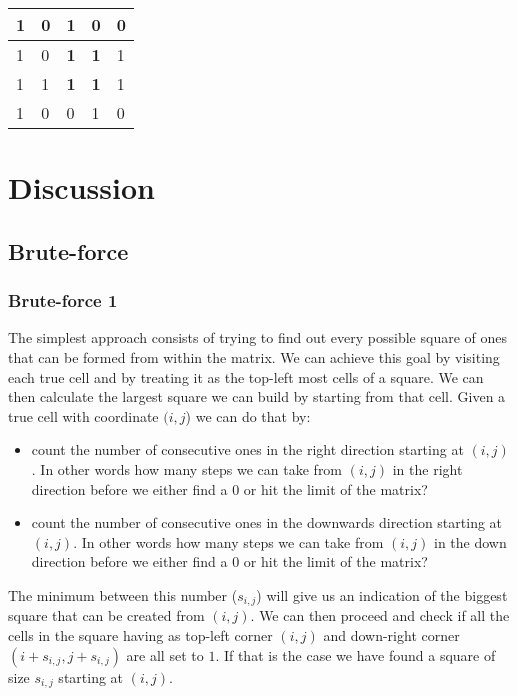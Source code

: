 \begin{exercise}
\begin{example}
		\begin{tabular}{|l|l|l|l|l|}
		\hline
		1 & 0 & 1                                  & 0                                  & 0 \\ \hline
		1 & 0 & \cellcolor[HTML]{32CB00}\textbf{1} & \cellcolor[HTML]{32CB00}\textbf{1} & 1 \\ \hline
		1 & 1 & \cellcolor[HTML]{32CB00}\textbf{1} & \cellcolor[HTML]{32CB00}\textbf{1} & 1 \\ \hline
		1 & 0 & 0                                  & 1                                  & 0 \\ \hline
\end{tabular}

	\end{example}

\end{exercise}


\section{Discussion}
\label{square_in_matrix:sec:discussion}

\subsection{Brute-force}
\label{square_in_matrix:sec:bruteforce}

\subsubsection{Brute-force 1}

The simplest approach consists of trying to find out every possible square of ones that can be formed from within the matrix. We can achieve this goal by visiting each true cell and by treating it as the top-left most cells of a square. We can then calculate the largest square we can build by starting from that cell. Given a true cell with coordinate $(i,j$) we can do that by:

\begin{itemize}
	 \item count the number of consecutive ones in the right direction starting at $(i,j)$. In other words how many steps we can take from $(i,j)$ in the right direction  before we either find a $0$ or hit the limit of the matrix? 
	 \item count the number of consecutive ones in the downwards direction starting at $(i,j)$. In other words how many steps we can take from $(i,j)$ in the down direction before we either find a $0$ or hit the limit of the matrix? 
\end{itemize}
The minimum between this number ($s_{i,j}$) will give us an indication of the biggest square that can be created from $(i,j)$. We can then proceed and check if all the cells in the square having as top-left corner $(i,j)$ and down-right corner $(i+s_{i,j},j+s_{i,j})$ are all set to $1$. If that is the case we have found a square of size $s_{i,j}$ starting at $(i,j)$. 

